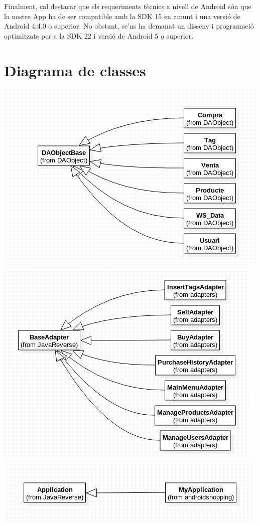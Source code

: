 \documentclass{article}
\begin{document}
Finalment, cal destacar que els requeriments tècnics a nivell de Android són que la nostre App ha de ser compatible amb la SDK 15 en amunt i una versió de Android 4.4.0 o superior. No obstant, se'ns ha demanat un disseny i programació optimitzats per a la SDK 22 i versió de Android 5 o superior.


\section{Diagrama de classes}

\begin{center}
	\includegraphics[scale=0.5]{img/1.png}
	\includegraphics[scale=0.5]{img/2.png}
	\includegraphics[scale=0.5]{img/3.png}

\end{center}
\end{document}
